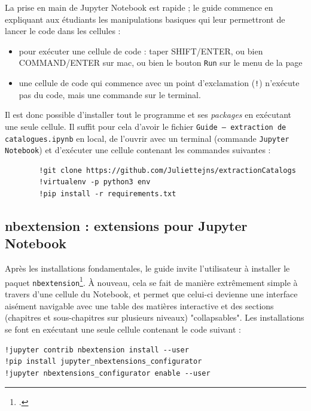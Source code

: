 \documentclass[a4paper,12pt,twoside]{book}
\begin{document}
La prise en main de Jupyter Notebook est rapide ; le guide commence en expliquant aux étudiants les manipulations basiques qui leur permettront de lancer le code dans les cellules :
\begin{itemize}
	\item pour exécuter une cellule de code : taper SHIFT/ENTER, ou bien COMMAND/ENTER sur mac, ou bien le bouton \texttt{Run} sur le menu de la page
	\item une cellule de code qui commence avec un point d'exclamation (\texttt{!}) n'exécute pas du code, mais une commande sur le terminal. 
\end{itemize} 

Il est donc possible d'installer tout le programme et ses \textit{packages} en exécutant une seule cellule. Il suffit pour cela d'avoir le fichier \texttt{Guide – extraction de catalogues.ipynb} en local, de l'ouvrir avec un terminal (commande \texttt{Jupyter Notebook}) et d'exécuter une cellule contenant les commandes suivantes : 

\begin{normalsize}
	\begin{verbatim}
		!git clone https://github.com/Juliettejns/extractionCatalogs
		!virtualenv -p python3 env
		!pip install -r requirements.txt
	\end{verbatim}
\end{normalsize}

\subsection{nbextension : extensions pour Jupyter Notebook}

Après les installations fondamentales, le guide invite l'utilisateur à installer le paquet \texttt{nbextension}\footcite{JupyterNotebookExtensions}. À nouveau, cela se fait de manière extrêmement simple à travers d'une cellule du Notebook, et permet que celui-ci devienne une interface aisément navigable avec une table des matières interactive et des sections (chapitres et sous-chapitres sur plusieurs niveaux) "collapsables". Les installations se font en exécutant une seule cellule contenant le code suivant : 
\begin{normalsize}
	\begin{verbatim}
!jupyter contrib nbextension install --user
!pip install jupyter_nbextensions_configurator
!jupyter nbextensions_configurator enable --user	
	\end{verbatim}
\end{normalsize}
\end{document}
